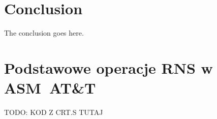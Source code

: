 \documentclass[10pt,journal,compsoc]{IEEEtran}
\begin{document}




\section{Conclusion}
The conclusion goes here.






%


\appendices
\section{Podstawowe operacje RNS w ASM~AT\&T}
TODO: KOD Z CRT.S TUTAJ

\end{document}
